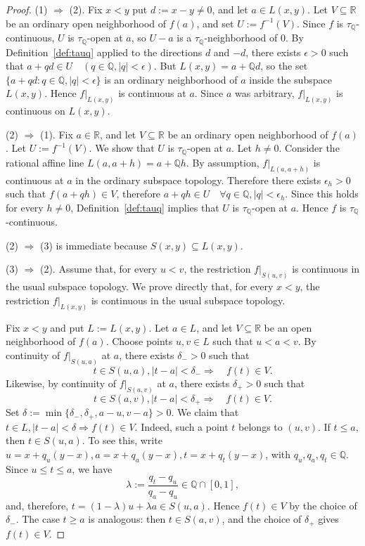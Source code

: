 \documentclass[11pt]{amsart} %
\theoremstyle{definition}
\newcommand{\R}{\mathbb{R}}
\newcommand{\Q}{\mathbb{Q}}
\begin{document}
\begin{proof}
(1) $\Rightarrow$ (2). Fix $x<y$ put $d:=x-y\ne0$, and let $a\in L(x,y).$ Let $V\subseteq\mathbb{R}$
be an ordinary open neighborhood of $f(a)$, and set
$U:=f^{-1}(V)$. 
Since $f$ is $\tau_{\Q}$-continuous, $U$ is $\tau_{\Q}$-open at $a$, so $U-a$ is a $\tau_{\Q}$-neighborhood of $0$. By
Definition~\ref{def:tauq} applied to the directions $d$ and $-d$, there exists $\epsilon>0$ such that  $a+qd\in U \quad (q\in\mathbb{Q},|q|<\epsilon).$
But $L(x,y)=a+\mathbb{Q}d$, 
so the set $\{a+qd:q\in\mathbb{Q}, |q|<\epsilon\}$ is an ordinary neighborhood of $a$ inside
the subspace $L(x,y)$. Hence $f|_{L(x,y)}$ is continuous at $a$. Since $a$ was arbitrary,
$f|_{L(x,y)}$ is continuous on $L(x,y)$.

(2) $\Rightarrow$ (1). Fix $a\in\mathbb{R}$, and let $V\subseteq\mathbb{R}$ be an ordinary open neighborhood of
$f(a)$. Let $U:=f^{-1}(V)$. 
We show that $U$ is $\tau_{\Q}$-open at $a$. Let $h\ne0.$ Consider the rational affine line
$L(a,a+h)=a+\mathbb{Q}h.$ By assumption, $f|_{L(a,a+h)}$ is continuous at $a$ in the ordinary subspace topology.
Therefore there exists $\epsilon_{h}>0$ such that $f(a+qh)\in V$, therefore 
$a+qh\in U \quad \forall  q\in\mathbb{Q},|q|<\epsilon_{h}$. 
Since this holds for every $h\ne0$, Definition~\ref{def:tauq} implies that $U$ is $\tau_{\Q}$-open at $a$.
Hence $f$ is $\tau_{\Q}$-continuous.

(2) $\Rightarrow$ (3) is immediate because $S(x,y)\subseteq L(x,y).$

(3) $\Rightarrow$ (2). %
Assume that, for every $u<v$, the restriction
$
f\big|_{S(u,v)}
$
is continuous in the usual subspace topology. We prove directly that, for every
$x<y$, the restriction
$
f\big|_{L(x,y)}
$
is continuous in the usual subspace topology.

Fix $x<y$ and put $L:=L(x,y)$. Let $a\in L$, and let $V\subseteq\R$ be an
open neighborhood of $f(a)$. Choose points $u,v\in L$ such that
$
u<a<v.$
By continuity of $f|_{S(u,a)}$ at $a$, there exists $\delta_->0$ such that
\begin{equation} 
t\in S(u,a), |t-a|<\delta_-
\Longrightarrow\quad
f(t)\in V.
\end{equation} 
Likewise, by continuity of $f|_{S(a,v)}$ at $a$, there exists $\delta_+>0$
such that
\begin{equation} 
t\in S(a,v), |t-a|<\delta_+
 \Longrightarrow\quad
f(t)\in V.
\end{equation} 
Set
$
\delta:=\min\{\delta_-,\delta_+,a-u,v-a\}>0.$
We claim that
$
t\in L, |t-a|<\delta \Longrightarrow
f(t)\in V.$ 
Indeed, such a point $t$ belongs to $(u,v)$. If $t\le a$, then
$t\in S(u,a)$. To see this, write
$
u=x+q_u(y-x), a=x+q_a(y-x), t=x+q_t(y-x)$, 
with $q_u,q_a,q_t\in\Q$. Since $u\le t\le a$, we have
\begin{equation} 
\lambda:=\frac{q_t-q_u}{q_a-q_u}\in\Q\cap[0,1],
\end{equation} 
and, therefore, 
$t=(1-\lambda)u+\lambda a\in S(u,a).$
Hence $f(t)\in V$ by the choice of $\delta_-$. The case $t\ge a$ is
analogous: then $t\in S(a,v)$, and the choice of $\delta_+$ gives
$f(t)\in V$.


\end{proof}
\end{document}
